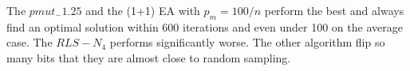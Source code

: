 The $pmut_-1.25$ and the (1+1) EA with $p_m=100/n$ perform the best and always find an optimal solution within 600 iterations and even under 100 on the average case.
The $RLS-N_4$ performs significantly worse.
The other algorithm flip so many bits that they are almost close to random sampling.